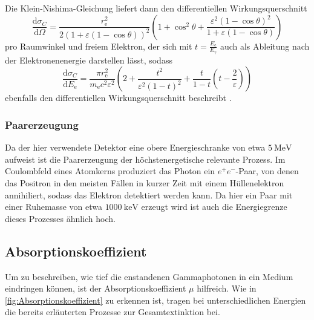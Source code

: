 Die Klein-Nishima-Gleichung liefert dann den differentiellen Wirkungsquerschnitt
\begin{equation}
    \frac{\text{d}\sigma_C}{\text{d}\Omega} = \frac{r_\text{e}^2}{2 (1 + \varepsilon (1 - \cos\theta))^2} 
                                              \left(1 + \cos^2\theta + \frac{\varepsilon^2 (1 - \cos\theta)^2}{1 + \varepsilon (1 - \cos\theta)} \right)
                                              \label{eq:dcrossomega}
\end{equation}
pro Raumwinkel und freiem Elektron, der sich mit $t = \frac{E_\text{e}}{E_\gamma}$ auch als Ableitung nach der Elektronenenergie darstellen lässt, sodass
\begin{equation}
    \frac{\text{d}\sigma_C}{\text{d}E_\text{e}} = \frac{\pi r^2_\text{e}}{m_\text{e} c^2 \varepsilon^2} 
                                                  \left(2 + \frac{t^2}{\varepsilon^2 (1-t)^2} + \frac{t}{1-t} \left(t - \frac{2}{\varepsilon}\right)\right)
    \label{eq:Comptonkontinuum}
\end{equation}
ebenfalls den differentiellen Wirkungsquerschnitt beschreibt \cite{Teilchendetektoren}.

\subsubsection{Paarerzeugung}

Da der hier verwendete Detektor eine obere Energieschranke von etwa $\SI{5}{\mega\eV}$ aufweist ist die Paarerzeugung der höchstenergetische relevante Prozess.
Im Coulombfeld eines Atomkerns produziert das Photon ein $e^+ e^-$-Paar, von denen das Positron in den meisten Fällen in kurzer Zeit mit einem Hüllenelektron annihiliert,
sodass das Elektron detektiert werden kann.
Da hier ein Paar mit einer Ruhemasse von etwa $\SI{1000}{\kilo\eV}$ erzeugt wird ist auch die Energiegrenze dieses Prozesses ähnlich hoch.


\subsection{Absorptionskoeffizient}

Um zu beschreiben, wie tief die enstandenen Gammaphotonen in ein Medium eindringen können, ist der Absorptionskoeffizient $\mu$ hilfreich.
Wie in \autoref{fig:Absorptionskoeffizient} zu erkennen ist, tragen bei unterschiedlichen Energien die bereits erläuterten Prozesse zur Gesamtextinktion bei.

